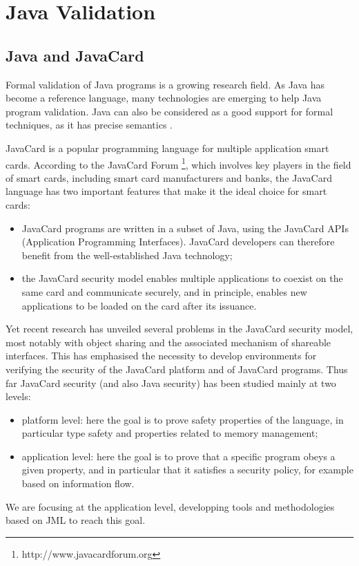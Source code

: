\chapter{Java Validation}
\section{Java and JavaCard}
 Formal validation of Java programs is a growing research
 field.  As Java has become a reference language, many technologies are
 emerging to help Java program validation.  Java can also be
 considered as a good support for formal techniques, as it has precise 
semantics \cite{Gosl00a}.

JavaCard is a popular programming language for multiple
application smart cards.  According to the JavaCard Forum \footnote{http://www.javacardforum.org},
which involves key players in the field of smart cards, 
including smart card manufacturers and banks, the JavaCard language has two
important features that make it the ideal choice for smart cards: 
\begin{itemize}
\item JavaCard programs are written in a subset of Java, using
the JavaCard APIs (Application Programming Interfaces). JavaCard
developers can therefore benefit from the well-established Java technology; 

\item the JavaCard security model enables multiple applications to
coexist  on the same card and communicate securely, and in principle,
enables new applications to be loaded on the card after its issuance.
\end{itemize}
Yet recent research has unveiled several problems in the JavaCard
security model, most notably with object sharing and the associated
mechanism of shareable interfaces.
This has  emphasised the necessity to develop environments for
verifying the security of the JavaCard platform and of JavaCard
programs.  Thus far JavaCard security (and also Java security) has
been studied  mainly at two levels:    
\begin{itemize}
\item  platform level: here the goal is to prove safety properties of
the language, in particular type safety and properties related to
memory management; 
\item  application level: here the goal is to prove that a specific
program obeys a given property, and in particular that it satisfies a
security policy, for example based on information flow. 
\end{itemize}
We are focusing at the application level, developping tools and methodologies based on JML to reach this goal.
